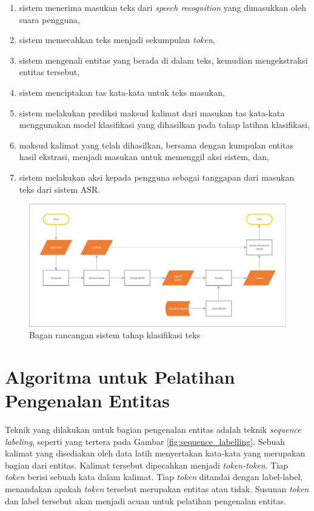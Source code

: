 \begin{enumerate}
	\item sistem menerima masukan teks dari \textit{speech recognition} yang dimasukkan oleh suara pengguna,
	\item sistem memecahkan teks menjadi sekumpulan \textit{token},
	\item sistem mengenali entitas yang berada di dalam teks, kemudian mengekstraksi entitas tersebut,
	\item sistem menciptakan tas kata-kata untuk teks masukan,
	\item sistem melakukan prediksi maksud kalimat dari masukan tas kata-kata menggunakan model klasifikasi yang dihasilkan pada tahap latihan klasifikasi,
	\item maksud kalimat yang telah dihasilkan, bersama dengan kumpulan entitas hasil ekstrasi, menjadi masukan untuk memenggil aksi sistem, dan,
	\item sistem melakukan aksi kepada pengguna sebagai tanggapan dari masukan teks dari sistem ASR.
\end{enumerate}

\begin{figure}[H]
	\centering
	\includegraphics[width=\textwidth, trim=2 2 2 2, clip]{resources/3/design_classification.pdf}
	\caption{Bagan rancangan sistem tahap klasifikasi teks}
	\label{fig:design_classification}
\end{figure}

\section{Algoritma untuk Pelatihan Pengenalan Entitas}

Teknik yang dilakukan untuk bagian pengenalan entitas adalah teknik \textit{sequence labeling}, seperti yang tertera pada Gambar \ref{fig:sequence_labelling}. Sebuah kalimat yang disediakan oleh data latih menyertakan kata-kata yang merupakan bagian dari entitas. Kalimat tersebut dipecahkan menjadi \textit{token-token}. Tiap \textit{token} berisi sebuah kata dalam kalimat. Tiap \textit{token} ditandai dengan label-label, menandakan apakah \textit{token} tersebut merupakan entitas atau tidak. Susunan \textit{token} dan label tersebut akan menjadi acuan untuk pelatihan pengenalan entitas.

